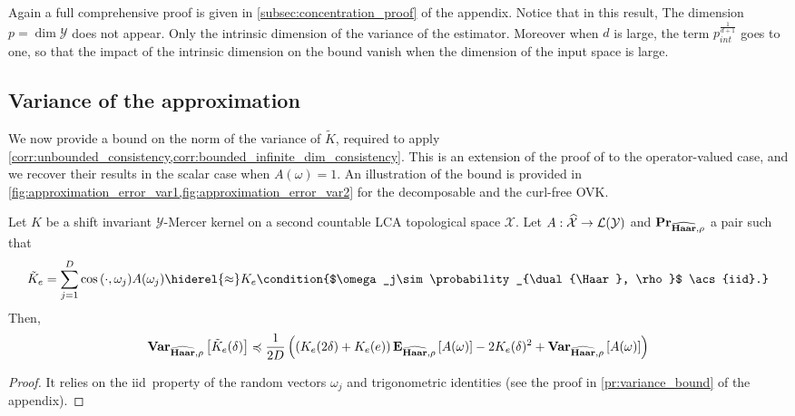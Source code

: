 Again a full comprehensive proof is given in \cref{subsec:concentration_proof}
of the appendix. Notice that in this result, The dimension
$p=\dim{\mathcal{Y}}$ does not appear. Only the intrinsic dimension of the
variance of the estimator. Moreover when $d$ is large, the term
$p_{int}^{\frac{1}{d + 1}}$ goes to one, so that the impact of the intrinsic
dimension on the bound vanish when the dimension of the input space is large.

\subsection{Variance of the  approximation}
We now provide a bound on the norm of the variance of $\tilde{K}$, required to
apply \cref{corr:unbounded_consistency,corr:bounded_infinite_dim_consistency}.
This is an extension of the proof of \citet{sutherland2015} to the
operator-valued case, and we recover their results in the scalar case when
$A(\omega)=1$. An illustration of the bound is provided in
\cref{fig:approximation_error_var1,fig:approximation_error_var2} for the
decomposable and the curl-free
\acs{OVK}.
\begin{proposition}
    \label{pr:variance_bound}
    Let $K$ be a shift invariant $\mathcal{Y}$-Mercer
    kernel on a second countable \ac{LCA} topological space $\mathcal{X}$. Let
    $A:\widehat{\mathcal{X}}\to\mathcal{L}(\mathcal{Y})$ and
    ${\mathbf{{Pr}}}_{\widehat{\mathbf{Haar}},\rho}$ a pair such that
    \begin{dmath*}
        \tilde{K}_e = \sum_{j=1}^D \cos{\pairing{\cdot,\omega_j}}A (\omega_j)
        \hiderel{\approx}
        K_e\condition{$\omega_j\sim\probability_{\dual{\Haar}, \rho}$
        \acs{iid}.}
    \end{dmath*}
    Then,
    \begin{dmath*}
        \variance_{\dual{\Haar}, \rho} \left[ \tilde{K}_e(\delta) \right]
        \preccurlyeq \frac{1}{2D} \left( \left( K_e(2\delta) + K_e(e) \right)
        \expectation_{\dual{\Haar}, \rho}\left[ A(\omega) \right] -
        2 K_e(\delta)^2 + \variance_{\dual{\Haar}, \rho}\left[
        A(\omega) \right]\right)
    \end{dmath*}
\end{proposition}
\begin{proof}
    It relies on the \ac{iid}~property of the random vectors $\omega_j$ and
    trigonometric identities (see the proof in \cref{pr:variance_bound} of the
    appendix).
\end{proof}
